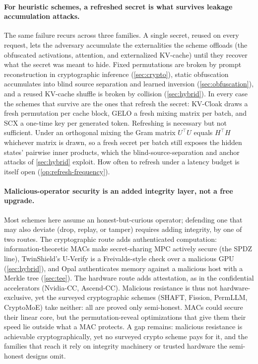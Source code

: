 \paragraph{For heuristic schemes, a refreshed secret is what survives leakage accumulation attacks.}
The same failure recurs across three families. A single secret, reused on every request, lets
the adversary accumulate the externalities the scheme offloads (the obfuscated activations,
attention, and externalized KV-cache) until they recover what the secret was meant to hide. Fixed permutations are broken by prompt reconstruction
in cryptographic inference (\cref{sec:crypto}), static obfuscation accumulates into blind source
separation and learned inversion (\cref{sec:obfuscation}), and a reused KV-cache shuffle is
broken by collision (\cref{sec:hybrid}). In every case the schemes that survive are the ones that
refresh the secret: KV-Cloak draws a fresh permutation per cache block, GELO a fresh mixing
matrix per batch, and SCX a one-time key per generated token. Refreshing is necessary but not
sufficient. Under an orthogonal mixing the Gram matrix $U^{\top}U$ equals $H^{\top}H$ whichever
matrix is drawn, so a fresh secret per batch still exposes the hidden states' pairwise inner
products, which the blind-source-separation and anchor attacks of \cref{sec:hybrid} exploit. How
often to refresh under a latency budget is itself open (\cref{op:refresh-frequency}).

\paragraph{Malicious-operator security is an added integrity layer, not a free upgrade.}
Most schemes here assume an honest-but-curious operator; defending one that may also deviate
(drop, replay, or tamper) requires adding integrity, by one of two routes. The cryptographic
route adds authenticated computation: information-theoretic MACs make secret-sharing MPC actively
secure (the SPDZ line), TwinShield's U-Verify is a Freivalds-style check over a malicious GPU
(\cref{sec:hybrid}), and Opal authenticates memory against a malicious host with a Merkle tree
(\cref{sec:tee}). The hardware route adds attestation, as in the confidential accelerators
(Nvidia-CC, Ascend-CC). Malicious resistance is thus not hardware-exclusive, yet the surveyed
cryptographic schemes (SHAFT, Fission, PermLLM, CryptoMoE) take neither: all are proved only
semi-honest. MACs could secure their linear core, but the permutation-reveal optimizations 
that give them their speed lie outside what a MAC protects. 
A gap remains: malicious resistance is achievable
cryptographically, yet no surveyed crypto scheme pays for it, and the families that reach it rely
on integrity machinery or trusted hardware the semi-honest designs omit.

